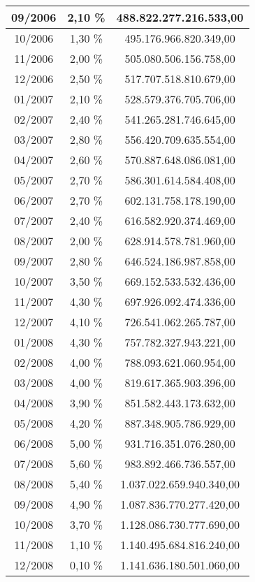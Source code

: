 \begin{center}
\begin{longtable}{|c|c|c|}
09/2006 & 2,10 \% & 488.822.277.216.533,00 \\ \hline
10/2006 & 1,30 \% & 495.176.966.820.349,00 \\ \hline
11/2006 & 2,00 \% & 505.080.506.156.758,00 \\ \hline
12/2006 & 2,50 \% & 517.707.518.810.679,00 \\ \hline
01/2007 & 2,10 \% & 528.579.376.705.706,00 \\ \hline
02/2007 & 2,40 \% & 541.265.281.746.645,00 \\ \hline
03/2007 & 2,80 \% & 556.420.709.635.554,00 \\ \hline
04/2007 & 2,60 \% & 570.887.648.086.081,00 \\ \hline
05/2007 & 2,70 \% & 586.301.614.584.408,00 \\ \hline
06/2007 & 2,70 \% & 602.131.758.178.190,00 \\ \hline
07/2007 & 2,40 \% & 616.582.920.374.469,00 \\ \hline
08/2007 & 2,00 \% & 628.914.578.781.960,00 \\ \hline
09/2007 & 2,80 \% & 646.524.186.987.858,00 \\ \hline
10/2007 & 3,50 \% & 669.152.533.532.436,00 \\ \hline
11/2007 & 4,30 \% & 697.926.092.474.336,00 \\ \hline
12/2007 & 4,10 \% & 726.541.062.265.787,00 \\ \hline
01/2008 & 4,30 \% & 757.782.327.943.221,00 \\ \hline
02/2008 & 4,00 \% & 788.093.621.060.954,00 \\ \hline
03/2008 & 4,00 \% & 819.617.365.903.396,00 \\ \hline
04/2008 & 3,90 \% & 851.582.443.173.632,00 \\ \hline
05/2008 & 4,20 \% & 887.348.905.786.929,00 \\ \hline
06/2008 & 5,00 \% & 931.716.351.076.280,00 \\ \hline
07/2008 & 5,60 \% & 983.892.466.736.557,00 \\ \hline
08/2008 & 5,40 \% & 1.037.022.659.940.340,00 \\ \hline
09/2008 & 4,90 \% & 1.087.836.770.277.420,00 \\ \hline
10/2008 & 3,70 \% & 1.128.086.730.777.690,00 \\ \hline
11/2008 & 1,10 \% & 1.140.495.684.816.240,00 \\ \hline
12/2008 & 0,10 \% & 1.141.636.180.501.060,00 \\ \hline

\end{longtable}
\end{center}
